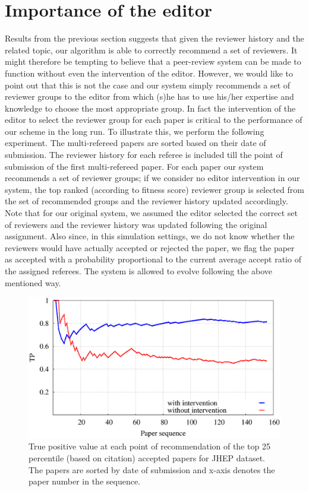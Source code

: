 \noindent
\section{Importance of the editor}
\label{editor_imp}

Results from the previous section suggests that given the reviewer history and the related topic, our algorithm is able to correctly recommend a set of reviewers. It might therefore be tempting to believe that a peer-review system can be made to function without even the intervention of the editor. However, we would like to point out that this is not the case and our system simply recommends a set of reviewer groups to the editor from which (s)he has to use his/her expertise and knowledge to choose the most appropriate group. In fact the intervention of the editor to select the reviewer group for each paper is critical to the performance of our scheme in the long run. To illustrate this, we perform the following experiment. The multi-refereed papers are sorted based on their date of submission. The reviewer history for each referee is included till the point of submission of the first multi-refereed paper. For each paper our system recommends a set of reviewer groups; if we consider no editor intervention in our system, the top ranked (according to fitness score) reviewer group is selected from the set of recommended groups and the 
reviewer history updated accordingly. Note that for our original system, we assumed the editor selected the correct set of reviewers and the reviewer history was updated following the original assignment. Also since, in this simulation settings, we do not know whether the reviewers would have actually accepted or rejected the paper, we flag the paper as accepted with a probability proportional to the current average accept ratio of the assigned referees. The system is allowed to evolve following the above mentioned way.   

\begin{figure}
\centering
\includegraphics[scale = 0.26]{./texfiles/Chapter_4/cikm_17/figures/G_A_comp.eps}
\caption{\label{fig:ed_imp}True positive value at each point of recommendation of the top 25 percentile (based on citation) accepted papers for JHEP dataset. 
The papers are sorted by date of submission and x-axis denotes the paper number in the sequence.}
\end{figure}
\medskip


